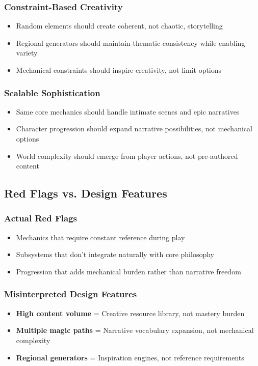 \subsubsection{Constraint-Based Creativity}
\begin{itemize}
    \item Random elements should create coherent, not chaotic, storytelling
    \item Regional generators should maintain thematic consistency while enabling variety
    \item Mechanical constraints should inspire creativity, not limit options
\end{itemize}

\subsubsection{Scalable Sophistication}
\begin{itemize}
    \item Same core mechanics should handle intimate scenes and epic narratives
    \item Character progression should expand narrative possibilities, not mechanical options
    \item World complexity should emerge from player actions, not pre-authored content
\end{itemize}

\subsection{Red Flags vs. Design Features}

\subsubsection{Actual Red Flags}
\begin{itemize}
    \item Mechanics that require constant reference during play
    \item Subsystems that don't integrate naturally with core philosophy
    \item Progression that adds mechanical burden rather than narrative freedom
\end{itemize}

\subsubsection{Misinterpreted Design Features}
\begin{itemize}
    \item \textbf{High content volume} = Creative resource library, not mastery burden
    \item \textbf{Multiple magic paths} = Narrative vocabulary expansion, not mechanical complexity
    \item \textbf{Regional generators} = Inspiration engines, not reference requirements
\end{itemize}

